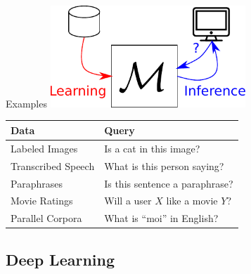 \documentclass{beamer}
\begin{document}
\begin{frame}{Examples}
    \centering
    \includegraphics[width=0.55\textwidth]{machinelearning.pdf}

    \vspace{3mm}
    \begin{center}
    { \small
    \begin{tabular}{l | l}
        Data & Query \\
        \hline
        \hline
        Labeled Images &
        Is a cat in this image?  \\
        Transcribed Speech &
        What is this person saying?  \\
        Paraphrases &
        Is this sentence a paraphrase? \\
        Movie Ratings & 
        Will a user $X$ like a movie $Y$? \\
        Parallel Corpora &
        What is ``moi'' in English?  
    \end{tabular}
    }
\end{center}
\end{frame}

\subsection{Deep Learning}
\end{document}
